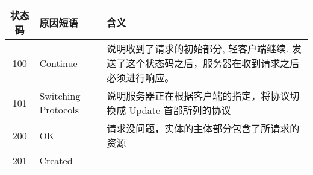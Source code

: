 \begin{longtable}[]{@{}cll@{}}
\toprule
\begin{minipage}[b]{0.32\columnwidth}\centering\strut
状态码\strut
\end{minipage} & \begin{minipage}[b]{0.30\columnwidth}\raggedright\strut
原因短语\strut
\end{minipage} & \begin{minipage}[b]{0.30\columnwidth}\raggedright\strut
含义\strut
\end{minipage}\tabularnewline
\midrule
\endhead
\begin{minipage}[t]{0.32\columnwidth}\centering\strut
100\strut
\end{minipage} & \begin{minipage}[t]{0.30\columnwidth}\raggedright\strut
Continue\strut
\end{minipage} & \begin{minipage}[t]{0.30\columnwidth}\raggedright\strut
说明收到了请求的初始部分, 轻客户端继续.
发送了这个状态码之后，服务器在收到请求之后必须进行响应。\strut
\end{minipage}\tabularnewline
\begin{minipage}[t]{0.32\columnwidth}\centering\strut
101\strut
\end{minipage} & \begin{minipage}[t]{0.30\columnwidth}\raggedright\strut
Switching Protocols\strut
\end{minipage} & \begin{minipage}[t]{0.30\columnwidth}\raggedright\strut
说明服务器正在根据客户端的指定，将协议切换成 Update 首部所列的协议\strut
\end{minipage}\tabularnewline
\begin{minipage}[t]{0.32\columnwidth}\centering\strut
200\strut
\end{minipage} & \begin{minipage}[t]{0.30\columnwidth}\raggedright\strut
OK\strut
\end{minipage} & \begin{minipage}[t]{0.30\columnwidth}\raggedright\strut
请求没问题，实体的主体部分包含了所请求的资源\strut
\end{minipage}\tabularnewline
\begin{minipage}[t]{0.32\columnwidth}\centering\strut
201\strut
\end{minipage} & \begin{minipage}[t]{0.30\columnwidth}\raggedright\strut
Created\strut
\end{minipage} & \begin{minipage}[t]{0.30\columnwidth}\raggedright\strut

\end{minipage}
\end{longtable}
